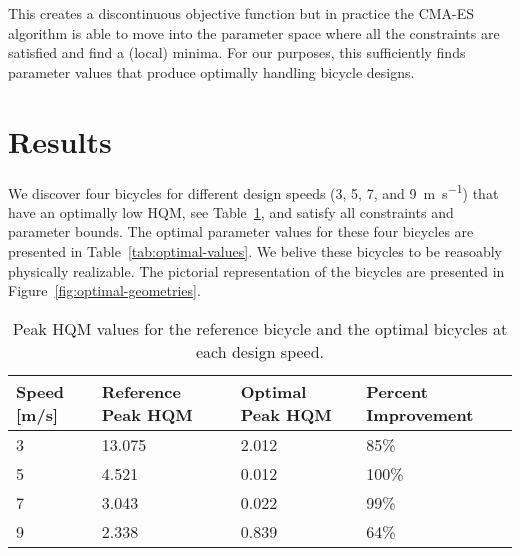 \documentclass{bmd2019p}
\begin{document}
This creates a discontinuous objective function but in practice the CMA-ES
algorithm is able to move into the parameter space where all the constraints
are satisfied and find a (local) minima. For our purposes, this sufficiently
finds parameter values that produce optimally handling bicycle designs.

\section{Results}
%
We discover four bicycles for different design speeds (3, 5, 7, and
9~\si{\meter\per\second}) that have an optimally low HQM, see
Table~\ref{tab:hqm}, and satisfy all constraints and parameter bounds. The
optimal parameter values for these four bicycles are presented in
Table~\ref{tab:optimal-values}. We belive these bicycles to be reasoably
physically realizable. The pictorial representation of the bicycles are
presented in Figure~\ref{fig:optimal-geometries}.
%
\begin{table}
  \caption{Peak HQM values for the reference bicycle and the optimal bicycles
    at each design speed.}
  \label{tab:hqm}
  \centering
  \begin{tabular}{llll}
    \toprule
    Speed [m/s] & Reference Peak HQM & Optimal Peak HQM & Percent Improvement \\
    \midrule
    3 & 13.075 & 2.012 & 85\% \\
    5 & 4.521  & 0.012 & 100\% \\
    7 & 3.043  & 0.022 & 99\% \\
    9 & 2.338  & 0.839 & 64\% \\
    \bottomrule
  \end{tabular}
\end{table}
%
\end{document}
